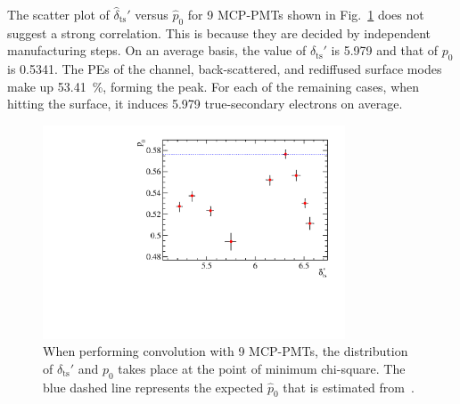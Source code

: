 The scatter plot of $\hat{\delta}_{\mathrm{ts}}'$ versus $\hat{p}_0$ for 9 MCP-PMTs shown in Fig.~\ref{fig:true_p} does not suggest a strong correlation. This is because they are decided by independent manufacturing steps. On an average basis, the value of $\delta_{\mathrm{ts}}'$ is 5.979 and that of $p_0$ is 0.5341. %
The PEs of the channel, back-scattered, and rediffused surface modes make up \SI{53.41}{\percent}, forming the peak. For each of the remaining cases, when hitting the surface, it induces 5.979 true-secondary electrons on average.
\begin{figure}[!htbp]
	\centering
	\includegraphics[width=0.8\textwidth]{PMTRelated/GTmodel/true_p.pdf}
	\caption{When performing convolution with 9 MCP-PMTs, the distribution of $\delta_{\mathrm{ts}}'$ and $p_0$ takes place at the point of minimum chi-square. The blue dashed line represents the expected $\hat{p}_0$ that is estimated from~\cite{chen2018photoelectron}. }
	\label{fig:true_p}
\end{figure}

